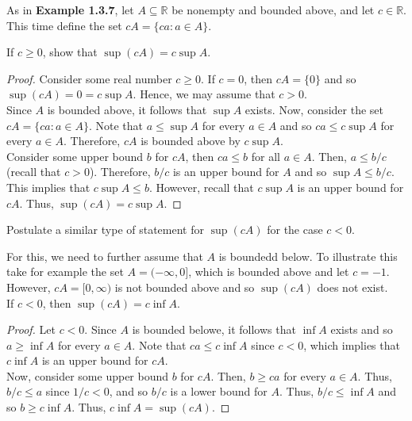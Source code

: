 \documentclass[12pt]{article}
\newcommand{\R}{\mathbb{R}}
\newenvironment{problem}[2][Problem]{\begin{trivlist}
		\item[\hskip \labelsep {\bfseries #1}\hskip \labelsep {\bfseries #2.}]}{\end{trivlist}}
\newenvironment{solution}[2][Solution]{\begin{trivlist}
		\item[\hskip \labelsep {\bfseries #1}\hskip \labelsep {\bfseries #2.}]}{\end{trivlist}}
\begin{document}
		\begin{problem}{1.3.5}
			As in \textbf{Example 1.3.7}, let $A\subseteq \R$ be nonempty and bounded above, and let $c\in \R$. This time define the set $cA = \{ca:a\in A\}$.
			\begin{enumerate}[label=(\alph*)]
				\item If $c\geq 0$, show that $\sup(cA) = c\sup A$.
				\begin{proof}
					Consider some real number $c\geq 0$. If $c=0$, then $cA = \{0\}$ and so $\sup (cA) = 0 = c\sup A$. Hence, we may assume that $c>0$.\\
					Since $A$ is bounded above, it follows that $\sup A$ exists. Now, consider the set $cA = \{ca:a\in A\}$. Note that $a\leq \sup A$ for every $a\in A$ and so $ca \leq c\sup A$ for every $a\in A$. Therefore, $cA$ is bounded above by $c\sup A$. \\
					
					Consider some upper bound $b$ for $cA$, then $ca \leq b$ for all $a\in A$. Then, $a\leq b/c$ (recall that $c>0$). Therefore, $b/c$ is an upper bound for $A$ and so $\sup A \leq b/c$. This implies that $c\sup A \leq b$. However, recall that $c\sup A$ is an upper bound for $cA$.
					Thus, $\sup (cA) = c\sup A$.
				\end{proof}
				\item Postulate a similar type of statement for $\sup(cA)$ for the case $c<0$.
				\begin{solution}{b}
					For this, we need to further assume that $A$ is boundedd below. To illustrate this take for example the set $A=(-\infty, 0]$, which is bounded above and let $c=-1$. However, $cA = [0,\infty)$ is not bounded above and so $\sup (cA)$ does not exist. \\
					
					If $c<0$, then $\sup(cA) = c\inf
					A$.
					\begin{proof}
						Let $c<0$. Since $A$ is bounded belowe, it follows that  $\inf A$ exists and so $a\geq \inf A$ for every $a\in A$. Note that $ca\leq c\inf A$ since $c<0$, which implies that $c\inf A$ is an upper bound for $cA$.\\
						Now, consider some upper bound $b$ for $cA$. Then, $b\geq ca$ for every $a\in A$. Thus, $b/c \leq a$ since $1/c < 0$, and so $b/c$ is a lower bound for $A$. Thus, $b/c \leq \inf A$ and so $b \geq c\inf A$. Thus, $c\inf A = \sup (cA)$. 
					\end{proof}
				\end{solution}
			\end{enumerate}
		\end{problem}
		
\end{document}

